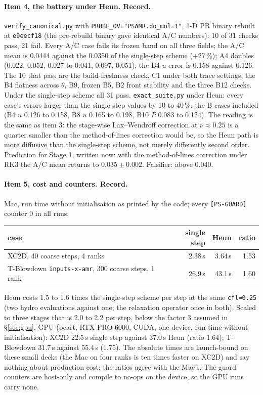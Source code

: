 \documentclass[11pt,a4paper]{article}
\newcommand{\code}[1]{\texttt{\small #1}}
\begin{document}
\paragraph{Item 4, the battery under Heun.  Record.}
\code{verify\_canonical.py} with \code{PROBE\_OV="PSAMR.do\_mol=1"}, 1-D PR
binary rebuilt at \code{e9eecf18} (the pre-rebuild binary gave identical
A/C numbers): 10 of 31 checks pass, 21 fail.  Every A/C case fails its
frozen band on all three fields; the A/C mean is 0.0444 against the
0.0350 of the single-step scheme (+27\,\%); A4 doubles (0.022, 0.052,
0.027 to 0.041, 0.097, 0.051); the B4 $u$-error is 0.158 against 0.126.
The 10 that pass are the build-freshness check, C1 under both trace
settings, the B4 flatness across $\theta$, B9, frozen B5, B2 front
stability and the three B12 checks.  Under the
single-step scheme all 31 pass.  \code{exact\_suite.py} under Heun: every
case's errors larger than the single-step values by 10 to 40\,\%, the B
cases included (B4 $u$ 0.126 to 0.158, B8 $u$ 0.165 to 0.198, B10 $P$
0.083 to 0.124).  The reading is the same as item 3: the stage-wise
Lax--Wendroff correction at $\nu \approx 0.25$ is a quarter smaller than
the method-of-lines correction would be, so the Heun path is more
diffusive than the single-step scheme, not merely differently
second order.  Prediction for Stage 1, written now: with the
method-of-lines correction under RK3 the A/C mean returns to
$0.035 \pm 0.002$.  Falsifier: above 0.040.

\paragraph{Item 5, cost and counters.  Record.}
Mac, run time without initialisation as printed by the code; every
\code{[PS-GUARD]} counter 0 in all runs:

\begin{center}
\small
\begin{tabular}{lrrr}
\toprule
case & single step & Heun & ratio \\
\midrule
XC2D, 40 coarse steps, 4 ranks & 2.38\,s & 3.64\,s & 1.53 \\
T-Blowdown \code{inputs-x-amr}, 300 coarse steps, 1 rank & 26.9\,s & 43.1\,s & 1.60 \\
\bottomrule
\end{tabular}
\end{center}

Heun costs 1.5 to 1.6 times the single-step scheme per step at the same
\code{cfl=0.25} (two hydro evaluations against one; the relaxation
operator once in both).  Scaled to three stages that is 2.0 to 2.2 per
step, below the factor 3 assumed in \S\ref{sec:gpu}.  GPU (peart, RTX PRO 6000, CUDA, one device, run
time without initialisation): XC2D 22.5\,s single step against 37.0\,s
Heun (ratio 1.64); T-Blowdown 31.7\,s against 55.4\,s (1.75).  The
absolute times are launch-bound on these small decks (the Mac on four
ranks is ten times faster on XC2D) and say nothing about production
cost; the ratios agree with the Mac's.  The guard counters are host-only
and compile to no-ops on the device, so the GPU runs carry none.
\end{document}
